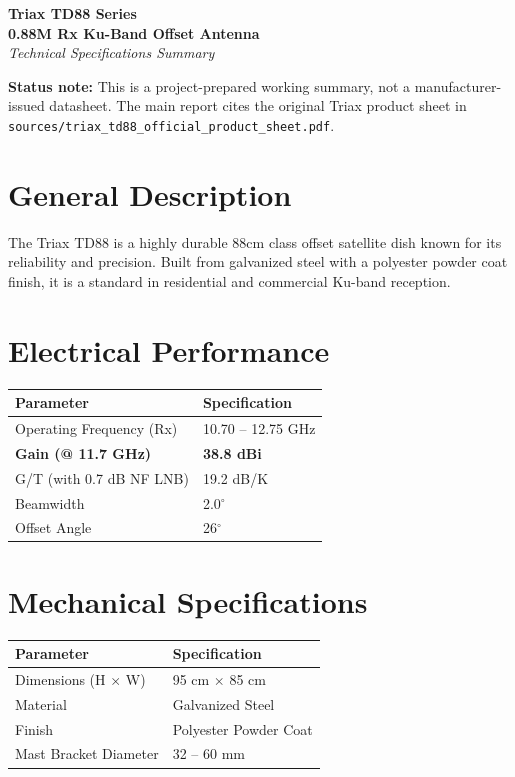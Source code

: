 \documentclass[a4paper,11pt]{article}
\begin{document}
\begin{center}
    \Huge \textbf{Triax TD88 Series} \\[0.2cm]
    \Large \textbf{0.88M Rx Ku-Band Offset Antenna} \\[0.5cm]
    \large \textit{Technical Specifications Summary}
\end{center}

\vspace{0.5cm}
\textbf{Status note:} This is a project-prepared working summary, not a manufacturer-issued datasheet. The main report cites the original Triax product sheet in \texttt{sources/triax\_td88\_official\_product\_sheet.pdf}.

\section*{General Description}
The Triax TD88 is a highly durable 88cm class offset satellite dish known for its reliability and precision. Built from galvanized steel with a polyester powder coat finish, it is a standard in residential and commercial Ku-band reception.

\section*{Electrical Performance}
\begin{table}[h!]
    \centering
    \begin{tabular}{@{}ll@{}}
        \toprule
        \textbf{Parameter} & \textbf{Specification} \\
        \midrule
        Operating Frequency (Rx) & 10.70 -- 12.75 GHz \\
        \textbf{Gain (@ 11.7 GHz)} & \textbf{38.8 dBi} \\
        G/T (with 0.7 dB NF LNB) & 19.2 dB/K \\
        Beamwidth & 2.0$^\circ$ \\
        Offset Angle & 26$^\circ$ \\
        \bottomrule
    \end{tabular}
\end{table}

\section*{Mechanical Specifications}
\begin{table}[h!]
    \centering
    \begin{tabular}{@{}ll@{}}
        \toprule
        \textbf{Parameter} & \textbf{Specification} \\
        \midrule
        Dimensions (H $\times$ W) & 95 cm $\times$ 85 cm \\
        Material & Galvanized Steel \\
        Finish & Polyester Powder Coat \\
        Mast Bracket Diameter & 32 -- 60 mm \\
        \bottomrule
    \end{tabular}
\end{table}
\end{document}
